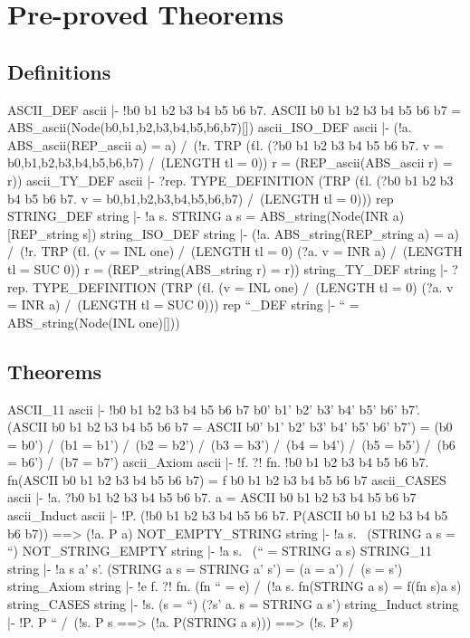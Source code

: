 \chapter{Pre-proved Theorems}

\section{Definitions}
\THEOREM ASCII\_DEF ascii
|- !b0 b1 b2 b3 b4 b5 b6 b7.
    ASCII b0 b1 b2 b3 b4 b5 b6 b7 =
    ABS_ascii(Node(b0,b1,b2,b3,b4,b5,b6,b7)[])
\ENDTHEOREM
\THEOREM ascii\_ISO\_DEF ascii
|- (!a. ABS_ascii(REP_ascii a) = a) /\
   (!r.
     TRP
     (\v tl.
       (?b0 b1 b2 b3 b4 b5 b6 b7. v = b0,b1,b2,b3,b4,b5,b6,b7) /\
       (LENGTH tl = 0))
     r =
     (REP_ascii(ABS_ascii r) = r))
\ENDTHEOREM
\THEOREM ascii\_TY\_DEF ascii
|- ?rep.
    TYPE_DEFINITION
    (TRP
     (\v tl.
       (?b0 b1 b2 b3 b4 b5 b6 b7. v = b0,b1,b2,b3,b4,b5,b6,b7) /\
       (LENGTH tl = 0)))
    rep
\ENDTHEOREM
\THEOREM STRING\_DEF string
|- !a s. STRING a s = ABS_string(Node(INR a)[REP_string s])
\ENDTHEOREM
\THEOREM string\_ISO\_DEF string
|- (!a. ABS_string(REP_string a) = a) /\
   (!r.
     TRP
     (\v tl.
       (v = INL one) /\ (LENGTH tl = 0) \/
       (?a. v = INR a) /\ (LENGTH tl = SUC 0))
     r =
     (REP_string(ABS_string r) = r))
\ENDTHEOREM
\THEOREM string\_TY\_DEF string
|- ?rep.
    TYPE_DEFINITION
    (TRP
     (\v tl.
       (v = INL one) /\ (LENGTH tl = 0) \/
       (?a. v = INR a) /\ (LENGTH tl = SUC 0)))
    rep
\ENDTHEOREM
\THEOREM ``\_DEF string
|- `` = ABS_string(Node(INL one)[]))
\ENDTHEOREM
\section{Theorems}
\THEOREM ASCII\_11 ascii
|- !b0 b1 b2 b3 b4 b5 b6 b7 b0' b1' b2' b3' b4' b5' b6' b7'.
    (ASCII b0 b1 b2 b3 b4 b5 b6 b7 =
     ASCII b0' b1' b2' b3' b4' b5' b6' b7') =
    (b0 = b0') /\
    (b1 = b1') /\
    (b2 = b2') /\
    (b3 = b3') /\
    (b4 = b4') /\
    (b5 = b5') /\
    (b6 = b6') /\
    (b7 = b7')
\ENDTHEOREM
\THEOREM ascii\_Axiom ascii
|- !f.
    ?! fn.
     !b0 b1 b2 b3 b4 b5 b6 b7.
      fn(ASCII b0 b1 b2 b3 b4 b5 b6 b7) = f b0 b1 b2 b3 b4 b5 b6 b7
\ENDTHEOREM
\THEOREM ascii\_CASES ascii
|- !a. ?b0 b1 b2 b3 b4 b5 b6 b7. a = ASCII b0 b1 b2 b3 b4 b5 b6 b7
\ENDTHEOREM
\THEOREM ascii\_Induct ascii
|- !P.
    (!b0 b1 b2 b3 b4 b5 b6 b7. P(ASCII b0 b1 b2 b3 b4 b5 b6 b7)) ==>
    (!a. P a)
\ENDTHEOREM
\THEOREM NOT\_EMPTY\_STRING string
|- !a s. ~(STRING a s = ``)
\ENDTHEOREM
\THEOREM NOT\_STRING\_EMPTY string
|- !a s. ~(`` = STRING a s)
\ENDTHEOREM
\THEOREM STRING\_11 string
|- !a s a' s'. (STRING a s = STRING a' s') = (a = a') /\ (s = s')
\ENDTHEOREM
\THEOREM string\_Axiom string
|- !e f. ?! fn. (fn `` = e) /\ (!a s. fn(STRING a s) = f(fn s)a s)
\ENDTHEOREM
\THEOREM string\_CASES string
|- !s. (s = ``) \/ (?s' a. s = STRING a s')
\ENDTHEOREM
\THEOREM string\_Induct string
|- !P. P `` /\ (!s. P s ==> (!a. P(STRING a s))) ==> (!s. P s)
\ENDTHEOREM
